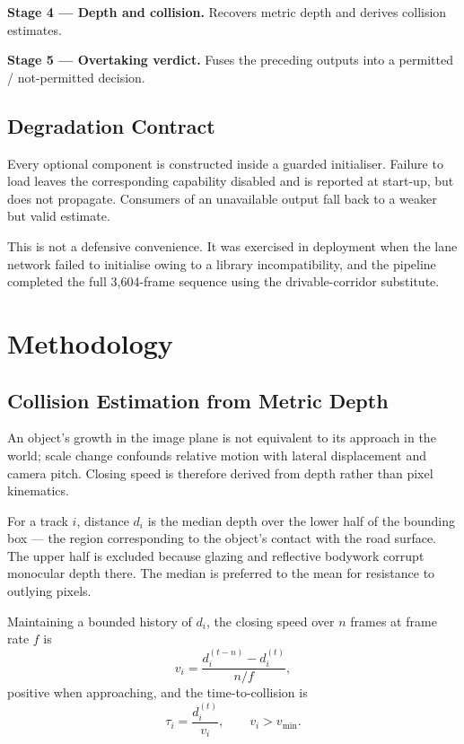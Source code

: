\documentclass[11pt,a4paper]{report}
\begin{document}
\textbf{Stage 4 — Depth and collision.} Recovers metric depth and derives
collision estimates.

\textbf{Stage 5 — Overtaking verdict.} Fuses the preceding outputs into a
permitted / not-permitted decision.

\section{Degradation Contract}

Every optional component is constructed inside a guarded initialiser. Failure to
load leaves the corresponding capability disabled and is reported at start-up,
but does not propagate. Consumers of an unavailable output fall back to a weaker
but valid estimate.

This is not a defensive convenience. It was exercised in deployment when the
lane network failed to initialise owing to a library incompatibility, and the
pipeline completed the full 3{,}604-frame sequence using the drivable-corridor
substitute.

\chapter{Methodology}

\section{Collision Estimation from Metric Depth}

An object's growth in the image plane is not equivalent to its approach in the
world; scale change confounds relative motion with lateral displacement and
camera pitch. Closing speed is therefore derived from depth rather than pixel
kinematics.

For a track $i$, distance $d_i$ is the median depth over the lower half of the
bounding box — the region corresponding to the object's contact with the road
surface. The upper half is excluded because glazing and reflective bodywork
corrupt monocular depth there. The median is preferred to the mean for
resistance to outlying pixels.

Maintaining a bounded history of $d_i$, the closing speed over $n$ frames at
frame rate $f$ is
\begin{equation}
  v_i = \frac{d_i^{(t-n)} - d_i^{(t)}}{n/f},
\end{equation}
positive when approaching, and the time-to-collision is
\begin{equation}
  \tau_i = \frac{d_i^{(t)}}{v_i}, \qquad v_i > v_{\min}.
\end{equation}
\end{document}

